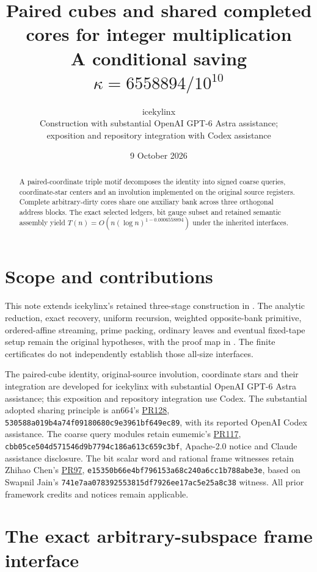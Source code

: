\documentclass[11pt]{article}
\title{Paired cubes and shared completed cores for integer multiplication\\
\large A conditional saving $\kappa=6558894/10^{10}$}
\author{icekylinx\\\small Construction with substantial OpenAI GPT-6 Astra assistance;\\
\small exposition and repository integration with Codex assistance}
\date{9 October 2026}
\begin{document}
\maketitle
\begin{abstract}
A paired-coordinate triple motif decomposes the identity into signed
coarse queries, coordinate-star centers and an involution implemented
on the original source registers. Complete arbitrary-dirty cores share
one auxiliary bank across three orthogonal address blocks. The exact
selected ledgers, bit gauge subset and retained semantic assembly yield
$T(n)=O(n(\log n)^{1-0.0006558894})$ under the inherited interfaces.
\end{abstract}

\section{Scope and contributions}
This note extends icekylinx's retained three-stage construction in
. The analytic reduction, exact
recovery, uniform recursion, weighted opposite-bank primitive,
ordered-affine streaming, prime packing, ordinary leaves and eventual
fixed-tape setup remain the original hypotheses, with the proof map in
. The finite certificates do
not independently establish those all-size interfaces.

The paired-cube identity, original-source involution, coordinate stars
and their integration are developed for icekylinx with substantial
OpenAI GPT-6 Astra assistance; this exposition and repository integration
use Codex. The substantial adopted sharing principle is an664's
\href{https://github.com/CrocSwap/integer-mult-bounds/pull/128}{PR128},
\texttt{530588a019b4a74f09180680c9e3961bf649ec89}, with its reported
OpenAI Codex assistance. The coarse query modules retain eumemic's
\href{https://github.com/CrocSwap/integer-mult-bounds/pull/117}{PR117},
\texttt{cbb05ce504d571546d9b7794c186a613c659c3bf}, Apache-2.0 notice
and Claude assistance disclosure. The bit scalar word and rational
frame witnesses retain Zhihao Chen's
\href{https://github.com/CrocSwap/integer-mult-bounds/pull/97}{PR97},
\texttt{e15350b66e4bf796153a68c240a6cc1b788abe3e}, based on Swapnil
Jain's \texttt{741e7aa078392553815df7926ee17ac5e25a8c38} witness.
All prior framework credits and notices remain applicable.

\section{The exact arbitrary-subspace frame interface}

\end{document}
